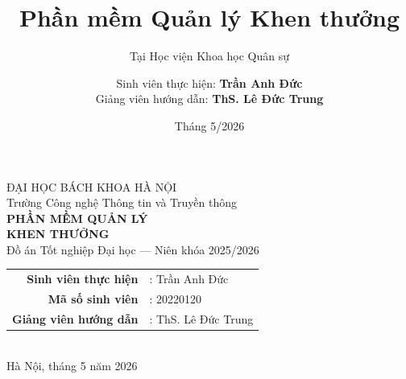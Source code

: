 \documentclass[aspectratio=43,xcolor=table]{beamer}
\title{Phần mềm Quản lý Khen thưởng}
\subtitle{Tại Học viện Khoa học Quân sự}
\author[Trần Anh Đức]{Sinh viên thực hiện: \textbf{Trần Anh Đức}\\Giảng viên hướng dẫn: \textbf{ThS. Lê Đức Trung}}
\institute[ĐHBKHN]{Trường Công nghệ Thông tin và Truyền thông --- Đại học Bách khoa Hà Nội}
\date{Tháng 5/2026}
\begin{document}
{
\begin{frame}[plain]
  \begin{center}
    \vspace{0.5cm}
    {\large \textcolor{hustdark}{ĐẠI HỌC BÁCH KHOA HÀ NỘI}}\\
    {\small \textcolor{textmuted}{Trường Công nghệ Thông tin và Truyền thông}}\\[1.2cm]

    {\Huge \textcolor{hustred}{\textbf{PHẦN MỀM QUẢN LÝ}}}\\[0.3cm]
    {\Huge \textcolor{hustred}{\textbf{KHEN THƯỞNG}}}\\[0.5cm]

    {\large Đồ án Tốt nghiệp Đại học --- Niên khóa 2025/2026}\\[1cm]

    \begin{tabular}{rl}
      \textbf{Sinh viên thực hiện} & : Trần Anh Đức \\
      \textbf{Mã số sinh viên} & : 20220120 \\
      \textbf{Giảng viên hướng dẫn} & : ThS. Lê Đức Trung \\
    \end{tabular}\\[0.6cm]

    {\small \textcolor{textmuted}{Hà Nội, tháng 5 năm 2026}}
  \end{center}
\end{frame}
}
\end{document}
